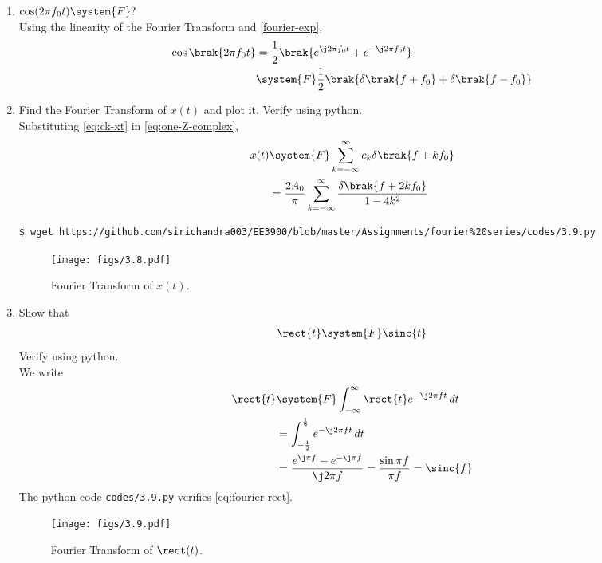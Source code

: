\documentclass[journal,12pt,twocolumn]{IEEEtran}
\renewcommand\thesection{\arabic{section}}
\begin{document}
\begin{enumerate}[label=\thesection.\arabic*
,ref=\thesection.\theenumi]
\solution Suppose $g(t)\system{F}G(f)$. Then,
\begin{align}
g(t)e^{\j2\pi f_0t}&\system{F}\int_{-\infty}^{\infty}
g(t)e^{-\j2\pi\brak{f-f_0}t}\, dt \\
&=F(f-f_0)
\label{eq:f-shift}
\end{align}
Using \eqref{eq:duality} in \eqref{eq:fourier-delta}, $1\system{F}\delta(-f)$.
Hence, applying \eqref{eq:f-shift},
\begin{align}
e^{-\j2\pi f_0t}\system{F}\delta(-(f+f_0)) = \delta(f+f_0)
\label{eq:fourier-exp}
\end{align}
\item $\cos(2\pi f_0t)\system{F}?$ \\
\solution Using the linearity of the Fourier
Transform and \eqref{fourier-exp},
\begin{align}
\cos\brak{2\pi f_0t} &= \frac{1}{2}
\brak{e^{\j2\pi f_0t} + e^{-\j2\pi f_0t}} \\
&\system{F}\frac{1}{2}\brak{\delta\brak{f+f_0} + \delta\brak{f-f_0}}
\end{align}
\item Find the Fourier Transform of $x(t)$ and plot it. Verify using python. \\
\solution Substituting \eqref{eq:ck-xt} in \eqref{eq:one-Z-complex},
\begin{align}
x(t)&\system{F}\sum_{k=-\infty}^{\infty}c_k\delta\brak{f+kf_0} \\
&=\frac{2A_0}{\pi}\sum_{k=-\infty}^{\infty}\frac{\delta\brak{f+2kf_0}}{1-4k^2}
\label{eq:fourier-xt}
\end{align}
\begin{lstlisting}
$ wget https://github.com/sirichandra003/EE3900/blob/master/Assignments/fourier%20series/codes/3.9.py
\end{lstlisting}
\begin{figure}[!ht]
\texttt{[image: figs/3.8.pdf]}
\caption{Fourier Transform of $x(t)$.}
\label{eq:fig-fourier-xt}
\end{figure}
\item Show that
\begin{align}
\rect{t} \system{F} \sinc{t}
\end{align}
Verify using python. \\
\solution We write
\begin{align}
\rect{t}&\system{F}\int_{-\infty}^{\infty}\rect{t}e^{-\j2\pi ft}\, dt \\
&=\int_{-\frac{1}{2}}^{\frac{1}{2}}e^{-\j2\pi ft}\, dt \\
&=\frac{e^{\j\pi f} - e^{-\j\pi f}}{\j2\pi f} = \frac{\sin{\pi f}}{\pi f} = \sinc{f}
\label{eq:fourier-rect}
\end{align}
The python code \texttt{codes/3.9.py} verifies \eqref{eq:fourier-rect}.
\begin{figure}[!ht]
\texttt{[image: figs/3.9.pdf]}
\caption{Fourier Transform of $\rect(t)$.}
\label{eq:fig-fourier-rect}
\end{figure}


\end{enumerate}
\end{document}
